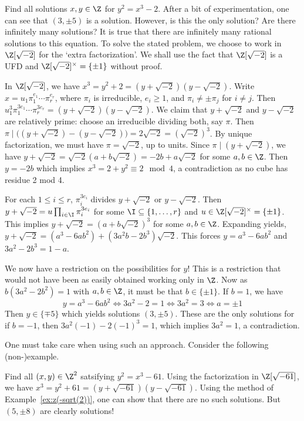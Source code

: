 \begin{ex}\label{ex:z(-sqrt(2))}
Find all solutions $x,y \in \Z$ for $y^2=x^3-2$. After a bit of experimentation, one can see that $(3,\pm 5)$ is a solution. However, is this the only solution? Are there infinitely many solutions? It is true that there are infinitely many rational solutions to this equation. To solve the stated problem, we choose to work in $\Z[\sqrt{-2}]$ for the `extra factorization'. We shall use the fact that $\Z[\sqrt{-2}]$ is a UFD and $\Z[\sqrt{-2}]^\times=\{\pm 1\}$ without proof. 

In $\Z[\sqrt{-2}]$, we have $x^3=y^2+2=(y+\sqrt{-2})(y-\sqrt{-2})$. Write $x=u_1 \pi_1^{e_1}\cdots \pi_r^{e_r}$, where $\pi_i$ is irreducible, $e_i \geq 1$, and $\pi_i \neq \pm \pi_j$ for $i \neq j$. Then $u_1^3 \pi_1^{3e_1}\cdots \pi_r^{3e_r}=(y+\sqrt{-2})(y-\sqrt{-2})$. We claim that $y+\sqrt{-2}$ and $y-\sqrt{-2}$ are relatively prime: choose an irreducible dividing both, say $\pi$. Then $\pi \mid \big((y+\sqrt{-2}) - (y-\sqrt{-2})\big)=2\sqrt{-2}=(\sqrt{-2})^3$. By unique factorization, we must have $\pi=\sqrt{-2}$, up to units. Since $\pi \mid (y+\sqrt{-2})$, we have $y+\sqrt{-2}=\sqrt{-2}(a+b\sqrt{-2})= -2b+a\sqrt{-2}$ for some $a,b \in \Z$. Then $y=-2b$ which implies $x^3=2+y^2 \equiv 2 \mod 4$, a contradiction as no cube has residue 2 mod 4. 

For each $1 \leq i \leq r$, $\pi_i^{3e_i}$ divides $y+\sqrt{-2}$ or $y-\sqrt{-2}$. Then $y+\sqrt{-2}=u \prod_{i \in \I} \pi_i^{3e_i}$ for some $\I \subseteq \{1,\ldots,r\}$ and $u \in \Z[\sqrt{-2}]^\times=\{\pm 1\}$. This implies $y+\sqrt{-2}=(a+b\sqrt{-2})^3$ for some $a,b \in \Z$. Expanding yields, $y+\sqrt{-2}=(a^3-6ab^2)+(3a^2b-2b^3)\sqrt{-2}$. This forces $y=a^3-6ab^2$ and $3a^2-2b^3=1-a$.

We now have a restriction on the possibilities for $y$! This is a restriction that would not have been as easily obtained working only in $\Z$. Now as $b(3a^2-2b^2)=1$ with $a,b \in \Z$, it must be that $b \in \{\pm 1\}$. If $b=1$, we have
	\[
	y= a^3 - 6ab^2 \Leftrightarrow 3a^2-2 =1 \Leftrightarrow 3a^2= 3 \Leftrightarrow a= \pm 1
	\]
Then $y \in \{\mp 5\}$ which yields solutions $(3, \pm 5)$. These are the only solutions for if $b= -1$, then $3a^2(-1)-2(-1)^3=1$, which implies $3a^2=1$, a contradiction. \xqed
\end{ex}


One must take care when using such an approach. Consider the following (non-)example. 


\begin{nex}\label{ex:factornonex}
Find all $(x,y) \in \Z^2$ satsifying $y^2=x^3-61$. Using the factorization in $\Z[\sqrt{-61}]$, we have $x^3=y^2+61=(y+\sqrt{-61})(y-\sqrt{-61})$. Using the method of Example~\ref{ex:z(-sqrt(2))}, one can show that there are no such solutions. But $(5, \pm 8)$ are clearly solutions! \xqed
\end{nex}


